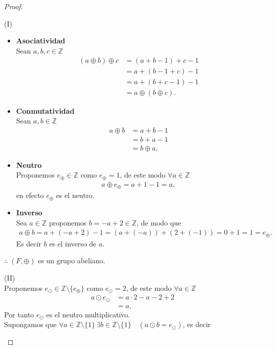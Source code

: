 \documentclass[11pt,letterpaper]{article}
\newcommand{\Z}{\mathbb{Z}}
\begin{document}
\begin{proof}\,\\
	\begin{tcolorbox}[title=Demostración, colframe=G, coltitle=B, fonttitle=\bfseries]
		(I)
	   \begin{itemize}
		\item \textbf{Asociatividad} \\
		Sean $a,b,c\in\Z$
		\begin{align*}
			(a\oplus b)\oplus c&=(a+b-1)+c-1\\
			&=a+(b-1+c)-1\\
			&=a+(b+c-1)-1\\
			&=a\oplus(b\oplus c).
		\end{align*}
		\item \textbf{Conmutatividad}\\
		Sean $a,b\in\Z$
		\begin{align*}
			a\oplus b&=a+b-1\\
			&=b+a-1\\
			&=b\oplus a.
		\end{align*}
		\item \textbf{Neutro}\\
		Proponemos $e_{\oplus}\in\Z$ como $e_{\oplus}=1$, de este modo $\forall a\in\Z$
			\begin{align*}
				a\oplus e_{\oplus}=a+1-1=a,
			\end{align*}
			en efecto $e_{\oplus}$ es el neutro.
			\item \textbf{Inverso}\\
			Sea $a\in\Z$ proponemos $b=-a+2\in\Z$, de modo que
			\begin{align*}
				a\oplus b=a+(-a+2)-1=(a+(-a))+(2+(-1))=0+1=1=e_{\oplus}.
			\end{align*}
			Es decir $b$ es el inverso de $a$.
	   \end{itemize}
	   $\therefore\; (F,\oplus)$ es un grupo abeliano.
\end{tcolorbox}
\begin{tcolorbox}
	(II)\\
	Proponemos $e_\odot\in\Z\setminus\{e_\oplus\}$ como $e_\odot=2$, de este modo $\forall a\in\Z$
	\begin{align*}
	 a\odot{e_\odot}&=a\cdot2-a-2+2\\
	 &=a.
	\end{align*}
	Por tanto $e_\odot$ es el neutro multiplicativo.\\
Supongamos que $\forall a \in \Z\setminus\{1\}\,\exists b\in\Z\setminus\{1\} \quad (a\odot b =e_\odot)$, es decir

\end{tcolorbox}
\end{proof}
\end{document}
